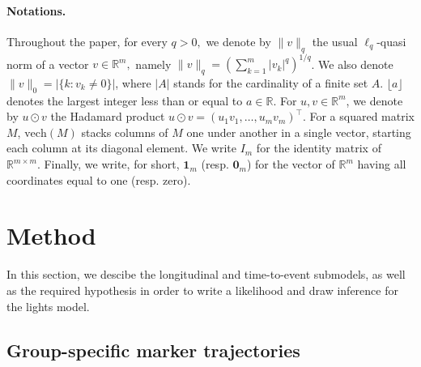 \documentclass[11pt]{article}
\newcommand{\norm}[1]{\|#1\|}
\newcommand{\R}{\mathds R}
\begin{document}
\paragraph{Notations.}

Throughout the paper, for every $q > 0,$ we denote by $\norm{v}_q$ the usual $\ell_q$-quasi norm of a vector $v \in \R^m,$ namely $\norm{v}_q =(\sum_{k=1}^m|v_k|^q)^{1/q}$. We also denote $\norm{v}_0 = |\{k : v_k \neq 0\}|$, where $|A|$ stands for the cardinality of a finite set $A$. $\lfloor a \rfloor$ denotes the largest integer less than or equal to $a \in \R$.
For $u, v \in \R^m$, we denote by $u \odot v$ the Hadamard product $u\odot v =(u_1v_1, \ldots, u_mv_m)^\top.$ 
For a squared matrix $M$, $\text{vech}(M)$ stacks columns of $M$ one under another in a single vector, starting each column at its diagonal element. We write $I_m$ for the identity matrix of $\R^{m \times m}$.
Finally, we write, for short, $\mathbf{1}_m$  (resp. $\mathbf{0}_m$) for the vector of $\R^m$ having all coordinates equal to one (resp. zero).


\section{Method}
\label{sec:Method}

In this section, we descibe the longitudinal and time-to-event submodels, as well as the required hypothesis in order to write a likelihood and draw inference for the lights model.

\subsection{Group-specific marker trajectories}
\end{document}
